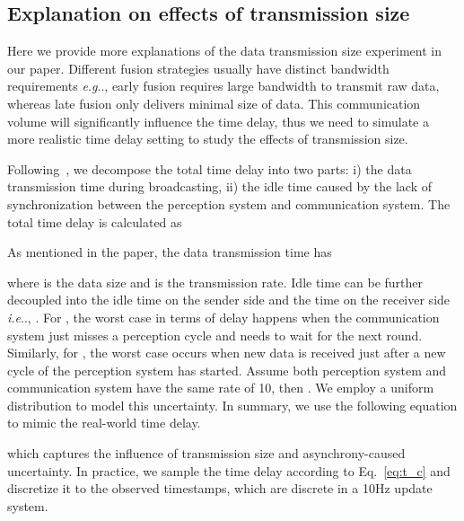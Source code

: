 \documentclass[runningheads]{llncs}
\makeatletter
\DeclareRobustCommand\onedot{\futurelet\@let@token\@onedot}
\def\@onedot{\ifx\@let@token.\else.\null\fi\xspace}
\def\eg{\emph{e.g}\onedot} \def\Eg{\emph{E.g}\onedot}
\def\ie{\emph{i.e}\onedot} \def\Ie{\emph{I.e}\onedot}
\makeatother
\begin{document}
\subsection{Explanation on effects of transmission size}
 Here we provide more explanations of the data transmission size experiment in our paper. Different fusion strategies usually have distinct bandwidth requirements \eg, early fusion requires large bandwidth to transmit raw data, whereas late fusion only delivers minimal size of data. This communication volume will significantly influence the time delay, thus we need to simulate a more realistic time delay setting to study the effects of transmission size.

Following~\cite{rauch2011analysis}, we decompose the total time delay into two parts: i) the data transmission time  during broadcasting, ii) the idle time  caused by the lack of synchronization between the perception system and communication system. The total time delay is calculated as 

As mentioned in the paper, the data transmission time has

where  is the data size and  is the transmission rate. Idle time  can be further decoupled into the idle time on the sender side and the time on the receiver side \ie, .
 For ,  the worst case in terms of delay happens when the communication system just misses a perception cycle and needs to wait for the next round. Similarly,  for  ,  the worst case occurs when new data is received just after a
new cycle of the perception system has started. Assume both perception system and communication system have the same rate of 10, then . We employ a uniform distribution  to model this uncertainty. In summary, we use the following equation to mimic the real-world time delay. 

which captures the influence of transmission size and asynchrony-caused uncertainty. In practice, we sample the time delay according to Eq.~\ref{eq:t_c} and discretize it to the observed timestamps, which are discrete in a 10Hz update system. 
\end{document}
